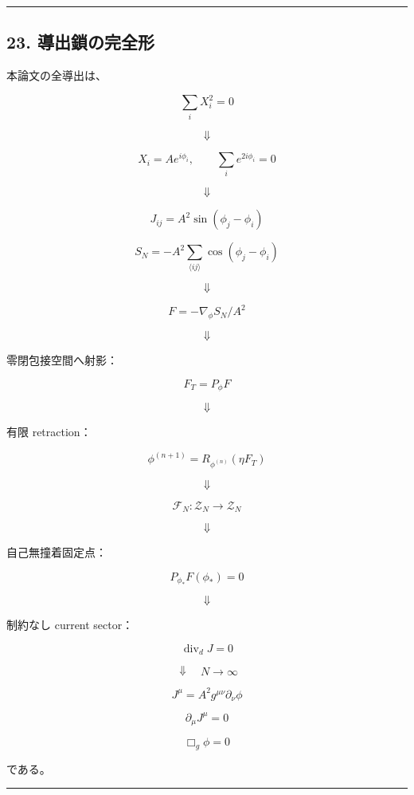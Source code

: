 \documentclass[
  a4paper,
]{ltjsarticle}
\begin{document}
\begin{center}\rule{0.5\linewidth}{0.5pt}\end{center}

\subsection{23.
導出鎖の完全形}\label{ux5c0eux51faux9396ux306eux5b8cux5168ux5f62}

本論文の全導出は、

\[
\boxed{
\sum_iX_i^2=0
}
\]

\[
\Downarrow
\]

\[
\boxed{
X_i=Ae^{i\phi_i},
\qquad
\sum_i e^{2i\phi_i}=0
}
\]

\[
\Downarrow
\]

\[
\boxed{
J_{ij}
=
A^2\sin(\phi_j-\phi_i)
}
\]

\[
\boxed{
S_N
=
-A^2
\sum_{\langle ij\rangle}
\cos(\phi_j-\phi_i)
}
\]

\[
\Downarrow
\]

\[
\boxed{
F
=
-\nabla_\phi S_N/A^2
}
\]

\[
\Downarrow
\]

零閉包接空間へ射影：

\[
\boxed{
F_T=P_\phi F
}
\]

\[
\Downarrow
\]

有限 retraction：

\[
\boxed{
\phi^{(n+1)}
=
R_{\phi^{(n)}}(\eta F_T)
}
\]

\[
\Downarrow
\]

\[
\boxed{
\mathcal F_N:
\mathcal Z_N
\to
\mathcal Z_N
}
\]

\[
\Downarrow
\]

自己無撞着固定点：

\[
\boxed{
P_{\phi_*}F(\phi_*)=0
}
\]

\[
\Downarrow
\]

制約なし current sector：

\[
\boxed{
\operatorname{div}_dJ=0
}
\]

\[
\Downarrow
\quad
N\to\infty
\]

\[
\boxed{
J^\mu
=
A^2g^{\mu\nu}\partial_\nu\phi
}
\]

\[
\boxed{
\partial_\mu J^\mu=0
}
\]

\[
\boxed{
\Box_g\phi=0
}
\]

である。

\begin{center}\rule{0.5\linewidth}{0.5pt}\end{center}
\end{document}
